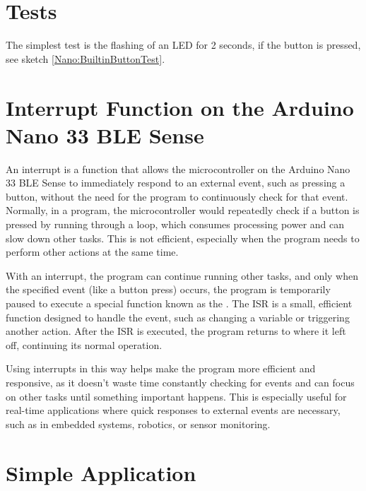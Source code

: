 \section{Tests}


The simplest test is the flashing of an LED for 2 seconds, if the button is pressed, see sketch \ref{Nano:BuiltinButtonTest}.

{
    \label{Nano:BuiltinButtonTest}
}

\section{Interrupt Function on the Arduino Nano 33 BLE Sense}


An interrupt is a function that allows the microcontroller on the Arduino Nano 33 BLE Sense to immediately respond to an external event, such as pressing a button, without the need for the program to continuously check for that event. Normally, in a program, the microcontroller would repeatedly check if a button is pressed by running through a loop, which consumes processing power and can slow down other tasks. This is not efficient, especially when the program needs to perform other actions at the same time.

With an interrupt, the program can continue running other tasks, and only when the specified event (like a button press) occurs, the program is temporarily paused to execute a special function known as the . The ISR is a small, efficient function designed to handle the event, such as changing a variable or triggering another action. After the ISR is executed, the program returns to where it left off, continuing its normal operation.

Using interrupts in this way helps make the program more efficient and responsive, as it doesn't waste time constantly checking for events and can focus on other tasks until something important happens. This is especially useful for real-time applications where quick responses to external events are necessary, such as in embedded systems, robotics, or sensor monitoring.



\section{Simple Application}



